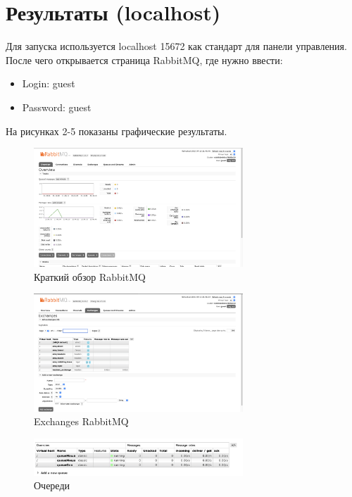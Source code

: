 \documentclass[areasetadvanced]{scrartcl}
\begin{document}
\section{Результаты (localhost)}
Для запуска используется localhost 15672 как стандарт для панели управления. После чего открывается страница RabbitMQ, где нужно ввести:
\begin{itemize}
	\item Login: guest
	\item Password: guest
\end{itemize}
На рисунках 2-5 показаны графические результаты.
\begin{figure}[H]
	\centering
	\includegraphics[width=0.7\textwidth]{Overview.png}
	\caption{Краткий обзор RabbitMQ}
	\label{fig:syntdiag}
\end{figure}

\begin{figure}[H]
	\centering
	\includegraphics[width=0.7\textwidth]{Exchanges.png}
	\caption{Exchanges RabbitMQ}
	\label{fig:syntdiag}
\end{figure}

\begin{figure}[H]
	\centering
	\includegraphics[width=0.7\textwidth]{q.png}
	\caption{Очереди}
	\label{fig:syntdiag}
\end{figure}
\end{document}
